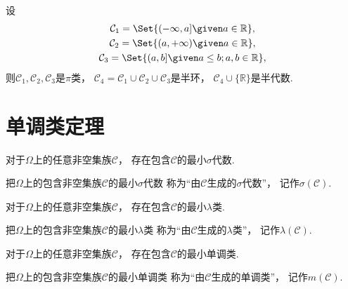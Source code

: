 \begin{example}
设\begin{gather*}
	\mathcal{C}_1 = \Set{ (-\infty,a] \given a\in\mathbb{R} }, \\
	\mathcal{C}_2 = \Set{ (a,+\infty) \given a\in\mathbb{R} }, \\
	\mathcal{C}_3 = \Set{ (a,b] \given a \leq b; a,b\in\mathbb{R} },
\end{gather*}
则\(\mathcal{C}_1,\mathcal{C}_2,\mathcal{C}_3\)是\(\pi\)类，
\(\mathcal{C}_4 = \mathcal{C}_1 \cup \mathcal{C}_2 \cup \mathcal{C}_3\)是半环，
\(\mathcal{C}_4 \cup \{\mathbb{R}\}\)是半代数.
\end{example}

\section{单调类定理}
\begin{proposition}
对于\(\Omega\)上的任意非空集族\(\mathcal{C}\)，
存在包含\(\mathcal{C}\)的最小\(\sigma\)代数.
\end{proposition}
\begin{definition}
把\(\Omega\)上的包含非空集族\(\mathcal{C}\)的最小\(\sigma\)代数
称为“由\(\mathcal{C}\)生成的\(\sigma\)代数”，
记作\(\sigma(\mathcal{C})\).
\end{definition}

\begin{proposition}
对于\(\Omega\)上的任意非空集族\(\mathcal{C}\)，
存在包含\(\mathcal{C}\)的最小\(\lambda\)类.
\end{proposition}
\begin{definition}
把\(\Omega\)上的包含非空集族\(\mathcal{C}\)的最小\(\lambda\)类
称为“由\(\mathcal{C}\)生成的\(\lambda\)类”，
记作\(\lambda(\mathcal{C})\).
\end{definition}

\begin{proposition}
对于\(\Omega\)上的任意非空集族\(\mathcal{C}\)，
存在包含\(\mathcal{C}\)的最小单调类.
\end{proposition}
\begin{definition}
把\(\Omega\)上的包含非空集族\(\mathcal{C}\)的最小单调类
称为“由\(\mathcal{C}\)生成的单调类”，
记作\(m(\mathcal{C})\).
\end{definition}


